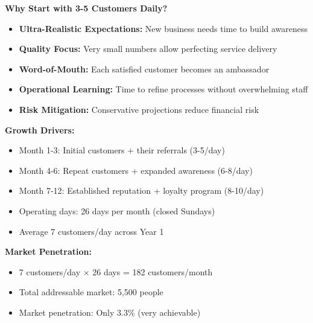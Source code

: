 \documentclass[a4paper,12pt]{article}
\begin{document}
\begin{tcolorbox}[mybox, title=\textbf{Conservative Forecast Rationale}]
\textbf{Why Start with 3-5 Customers Daily?}
\begin{itemize}[leftmargin=1em, itemsep=0pt]
    \item \textbf{Ultra-Realistic Expectations:} New business needs time to build awareness
    \item \textbf{Quality Focus:} Very small numbers allow perfecting service delivery
    \item \textbf{Word-of-Mouth:} Each satisfied customer becomes an ambassador
    \item \textbf{Operational Learning:} Time to refine processes without overwhelming staff
    \item \textbf{Risk Mitigation:} Conservative projections reduce financial risk
\end{itemize}

\textbf{Growth Drivers:}
\begin{itemize}[leftmargin=1em, itemsep=0pt]
    \item Month 1-3: Initial customers + their referrals (3-5/day)
    \item Month 4-6: Repeat customers + expanded awareness (6-8/day)
    \item Month 7-12: Established reputation + loyalty program (8-10/day)
    \item Operating days: 26 days per month (closed Sundays)
    \item Average 7 customers/day across Year 1
\end{itemize}

\textbf{Market Penetration:}
\begin{itemize}[leftmargin=1em, itemsep=0pt]
    \item 7 customers/day × 26 days = 182 customers/month
    \item Total addressable market: 5,500 people
    \item Market penetration: Only 3.3\% (very achievable)
\end{itemize}
\end{tcolorbox}

\vspace{1em}
\end{document}
